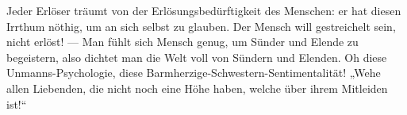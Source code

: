 Jeder Erlöser träumt von der Erlösungsbedürftigkeit des Menschen: er hat diesen Irrthum nöthig, um an sich selbst zu glauben. Der Mensch will gestreichelt sein, nicht erlöst! — Man fühlt sich Mensch genug, um Sünder und Elende zu begeistern, also dichtet man die Welt voll von Sündern und Elenden. Oh diese Unmanns-Psychologie, diese Barmherzige-Schwestern-Sentimentalität! „Wehe allen Liebenden, die nicht noch eine Höhe haben, welche über ihrem Mitleiden ist!“
\par

